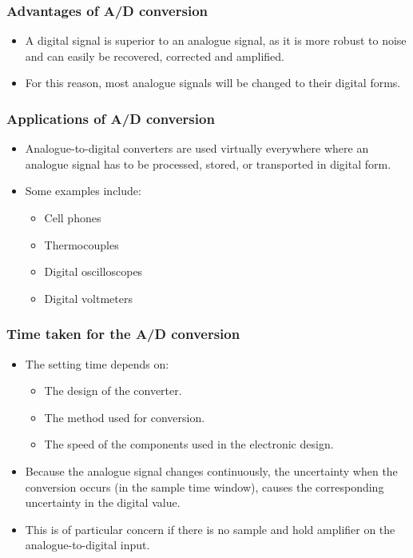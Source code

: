 \documentclass[11pt]{article}
\begin{document}
\subsubsection{Advantages of A/D conversion}
\label{sec:org8f315cd}
\begin{itemize}
\item A digital signal is superior to an analogue signal, as it is more robust to noise and can easily be recovered, corrected and amplified.
\item For this reason, most analogue signals will be changed to their digital forms.
\end{itemize}
\subsubsection{Applications of A/D conversion}
\label{sec:org7b5d660}
\begin{itemize}
\item Analogue-to-digital converters are used virtually everywhere where an analogue signal has to be processed, stored, or transported in digital form.
\item Some examples include:
\begin{itemize}
\item Cell phones
\item Thermocouples
\item Digital oscilloscopes
\item Digital voltmeters
\end{itemize}
\end{itemize}
\subsubsection{Time taken for the A/D conversion}
\label{sec:orge48e19e}
\begin{itemize}
\item The setting time depends on:
\begin{itemize}
\item The design of the converter.
\item The method used for conversion.
\item The speed of the components used in the electronic design.
\end{itemize}
\item Because the analogue signal changes continuously, the uncertainty when the conversion occurs (in the sample time window), causes the corresponding uncertainty in the digital value.
\item This is of particular concern if there is no sample and hold amplifier on the analogue-to-digital input.
\end{itemize}
\end{document}
